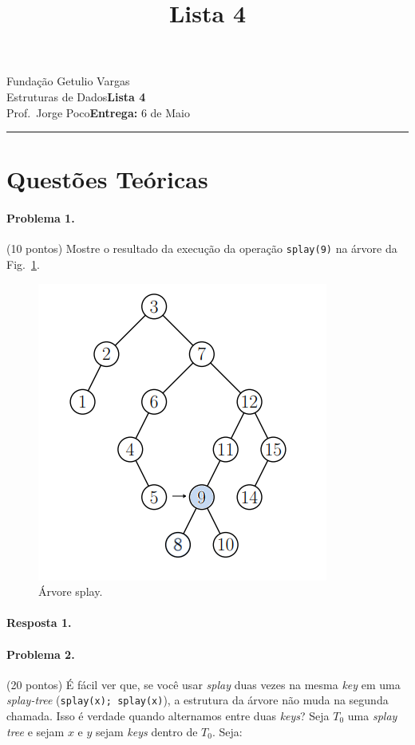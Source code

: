 \documentclass{article}
\title{Lista 4}
\date{}
\newcommand{\assignment}{Lista 4}
\newcommand{\duedate}{6 de Maio}
\begin{document}
Fundação Getulio Vargas\hfill\\
Estruturas de Dados\hfill\textbf{\assignment}\\
Prof.\ Jorge Poco\hfill\textbf{Entrega:} \duedate\\
\smallskip\hrule\bigskip

{\let\newpage\relax\maketitle}
\maketitle

\section{Questões Teóricas}

\paragraph{Problema 1.} (10 pontos)
Mostre o resultado da execução da operação \texttt{splay(9)} na árvore da Fig.~\ref{fig:prob1}.

\begin{figure}[h]
    \centering
    \includegraphics[width = 0.4\linewidth]{figs/fig1.png}
    \caption{Árvore splay.}
    \label{fig:prob1}
\end{figure}

\paragraph{Resposta 1.}

\paragraph{Problema 2.} (20 pontos)
É fácil ver que, se você usar \textit{splay} duas vezes na mesma \textit{key} em uma \textit{splay-tree} (\texttt{splay(x); splay(x)}), a estrutura da árvore não muda na segunda chamada.
%
Isso é verdade quando alternamos entre duas \textit{keys}? Seja $T_0$ uma \textit{splay tree} e sejam $x$ e $y$ sejam \textit{keys} dentro de $T_0$. Seja:
\end{document}
